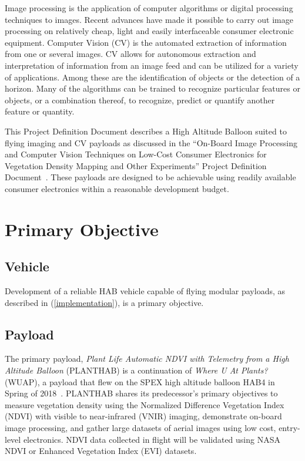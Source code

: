 \documentclass[conference]{IEEEtran} %
\begin{document}
Image processing is the application of computer algorithms or digital processing techniques to images.
Recent advances have made it possible to carry out image processing on relatively cheap, light and easily interfaceable consumer electronic equipment.
Computer Vision (CV) is the automated extraction of information from one or several images.
CV allows for autonomous extraction and interpretation of information from an image feed and can be utilized for a variety of applications.
Among these are the identification of objects or the detection of a horizon.
Many of the algorithms can be trained to recognize particular features or objects, or a combination thereof, to recognize, predict or quantify another feature or quantity.

This Project Definition Document describes a High Altitude Balloon suited to flying imaging and CV payloads as discussed in the ``On-Board Image Processing and Computer Vision Techniques on Low-Cost Consumer Electronics for Vegetation Density Mapping and Other Experiments'' Project Definition Document~\cite{habcvpdd}.
These payloads are designed to be achievable using readily available consumer electronics within a reasonable development budget.

\section{Primary Objective}
\label{primaryobjectives}
\subsection{Vehicle}
\label{vehicleobjectives}
Development of a reliable HAB vehicle capable of flying modular payloads, as described in (\autoref{implementation}), is a primary objective.

\subsection{Payload}
\label{payloadobjectives}
The primary payload, \textit{Plant Life Automatic NDVI with Telemetry from a High Altitude Balloon} (PLANTHAB) is a continuation of \textit{Where U At Plants?} (WUAP), a payload that flew on the SPEX high altitude balloon  HAB4 in Spring of 2018~\cite{wuaphab4}.
PLANTHAB shares its predecessor's primary objectives to measure vegetation density using the Normalized Difference Vegetation Index (NDVI) with visible to near-infrared (VNIR) imaging, demonstrate on-board image processing, and gather large datasets of aerial images using low cost, entry-level electronics.
NDVI data collected in flight will be validated using NASA NDVI or Enhanced Vegetation Index (EVI) datasets.
\end{document}
